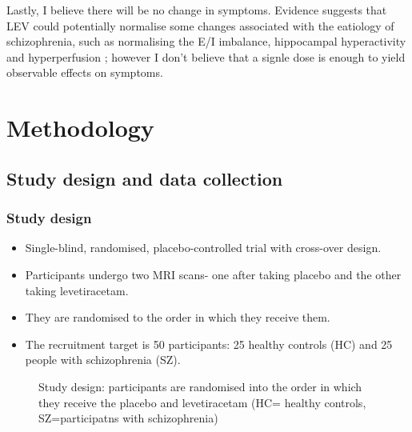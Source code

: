 \documentclass[
  letterpaper,
  DIV=11,
  numbers=noendperiod]{scrartcl}
\providecommand{\tightlist}{%
  \setlength{\itemsep}{0pt}\setlength{\parskip}{0pt}}\usepackage{longtable,booktabs,array}
\begin{document}
Lastly, I believe there will be no change in symptoms. Evidence suggests
that LEV could potentially normalise some changes associated with the
eatiology of schizophrenia, such as normalising the E/I imbalance,
hippocampal hyperactivity \autocite{roeske_modulation_2023} and
hyperperfusion \autocite{goff_levetiracetam_2020}; however I don't
believe that a signle dose is enough to yield observable effects on
symptoms.

\section{Methodology}\label{methodology}

\subsection{Study design and data
collection}\label{study-design-and-data-collection}

\subsubsection{Study design}\label{study-design}

\begin{itemize}
\tightlist
\item
  Single-blind, randomised, placebo-controlled trial with cross-over
  design.
\item
  Participants undergo two MRI scans- one after taking placebo and the
  other taking levetiracetam.
\item
  They are randomised to the order in which they receive them.
\item
  The recruitment target is 50 participants: 25 healthy controls (HC)
  and 25 people with schizophrenia (SZ).
\end{itemize}

\begin{figure}


\caption{\label{fig-study_design}Study design: participants are
randomised into the order in which they receive the placebo and
levetiracetam (HC= healthy controls, SZ=participatns with
schizophrenia)}

\end{figure}%
\end{document}
